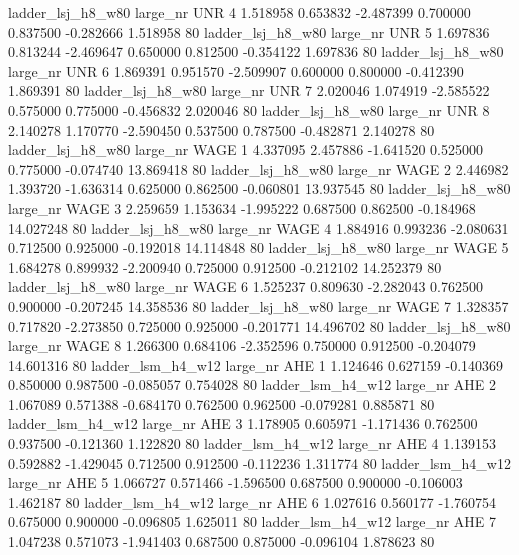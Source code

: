   ladder_lsj_h8_w80   large_nr      UNR                 4  1.518958  0.653832  -2.487399 0.700000 0.837500 -0.282666    1.518958 80
  ladder_lsj_h8_w80   large_nr      UNR                 5  1.697836  0.813244  -2.469647 0.650000 0.812500 -0.354122    1.697836 80
  ladder_lsj_h8_w80   large_nr      UNR                 6  1.869391  0.951570  -2.509907 0.600000 0.800000 -0.412390    1.869391 80
  ladder_lsj_h8_w80   large_nr      UNR                 7  2.020046  1.074919  -2.585522 0.575000 0.775000 -0.456832    2.020046 80
  ladder_lsj_h8_w80   large_nr      UNR                 8  2.140278  1.170770  -2.590450 0.537500 0.787500 -0.482871    2.140278 80
  ladder_lsj_h8_w80   large_nr     WAGE                 1  4.337095  2.457886  -1.641520 0.525000 0.775000 -0.074740   13.869418 80
  ladder_lsj_h8_w80   large_nr     WAGE                 2  2.446982  1.393720  -1.636314 0.625000 0.862500 -0.060801   13.937545 80
  ladder_lsj_h8_w80   large_nr     WAGE                 3  2.259659  1.153634  -1.995222 0.687500 0.862500 -0.184968   14.027248 80
  ladder_lsj_h8_w80   large_nr     WAGE                 4  1.884916  0.993236  -2.080631 0.712500 0.925000 -0.192018   14.114848 80
  ladder_lsj_h8_w80   large_nr     WAGE                 5  1.684278  0.899932  -2.200940 0.725000 0.912500 -0.212102   14.252379 80
  ladder_lsj_h8_w80   large_nr     WAGE                 6  1.525237  0.809630  -2.282043 0.762500 0.900000 -0.207245   14.358536 80
  ladder_lsj_h8_w80   large_nr     WAGE                 7  1.328357  0.717820  -2.273850 0.725000 0.925000 -0.201771   14.496702 80
  ladder_lsj_h8_w80   large_nr     WAGE                 8  1.266300  0.684106  -2.352596 0.750000 0.912500 -0.204079   14.601316 80
  ladder_lsm_h4_w12   large_nr      AHE                 1  1.124646  0.627159  -0.140369 0.850000 0.987500 -0.085057    0.754028 80
  ladder_lsm_h4_w12   large_nr      AHE                 2  1.067089  0.571388  -0.684170 0.762500 0.962500 -0.079281    0.885871 80
  ladder_lsm_h4_w12   large_nr      AHE                 3  1.178905  0.605971  -1.171436 0.762500 0.937500 -0.121360    1.122820 80
  ladder_lsm_h4_w12   large_nr      AHE                 4  1.139153  0.592882  -1.429045 0.712500 0.912500 -0.112236    1.311774 80
  ladder_lsm_h4_w12   large_nr      AHE                 5  1.066727  0.571466  -1.596500 0.687500 0.900000 -0.106003    1.462187 80
  ladder_lsm_h4_w12   large_nr      AHE                 6  1.027616  0.560177  -1.760754 0.675000 0.900000 -0.096805    1.625011 80
  ladder_lsm_h4_w12   large_nr      AHE                 7  1.047238  0.571073  -1.941403 0.687500 0.875000 -0.096104    1.878623 80
